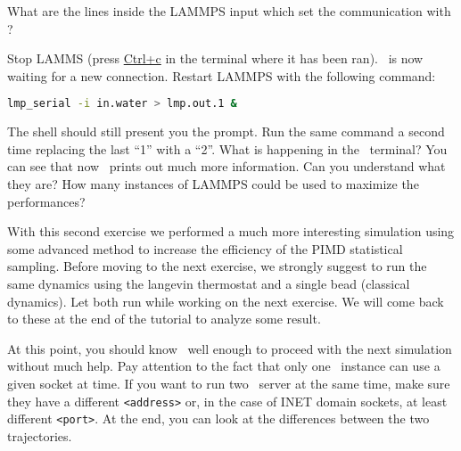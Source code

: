 \documentclass{article}
\begin{document}
\begin{Exercise}[label={inputs},title={Liquid water with the
    \emph{PIGLET} thermostat}]
What are the lines inside the LAMMPS input which set the communication
with \ipi ?

\Question
Stop LAMMS (press \url{Ctrl+c} in the terminal where it has been
ran). \ipi\ is now waiting for a new connection. Restart LAMMPS with
the following command:
\begin{lstlisting}[language=bash]
lmp_serial -i in.water > lmp.out.1 &
\end{lstlisting}
The shell should still present you the prompt. Run the same command a
second time replacing the last ``1'' with a ``2''. What is happening
in the \ipi\ terminal? You can see that now \ipi\ prints out much more
information. Can you understand what they are? How many instances of
LAMMPS could be used to maximize the performances?

\end{Exercise}

With this second exercise we performed a much more interesting
simulation using some advanced method to increase the efficiency of
the PIMD statistical sampling. Before moving to the next exercise, we
strongly suggest to run the same dynamics using the langevin thermostat and a
single bead (classical dynamics).
Let both run while working on the next exercise. We
will come back to these at the end of the tutorial to analyze some
result. 

At this point, you should know \ipi\ well enough to
proceed with the next simulation without much help. Pay attention to
the fact that only one \ipi\ instance can use a given socket at
time. If you want to run two \ipi\ server at the same time, make sure
they have a different \texttt{<address>} or, in the case of INET domain
sockets, at least different \texttt{<port>}. At the end, you can look
at the differences between the two trajectories.

\vspace{2em}
\end{document}
